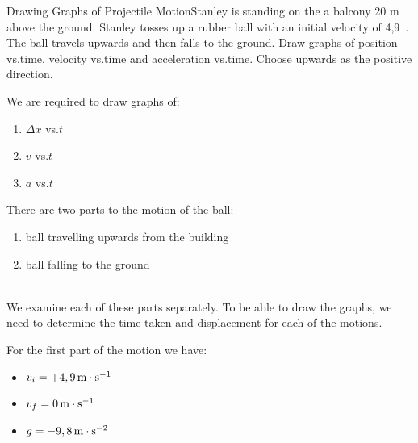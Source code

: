 \begin{wex}{Drawing Graphs of Projectile Motion}{Stanley is standing on the a balcony 20 m above the ground. Stanley tosses up a rubber ball with an initial velocity of 4,9~\ms. The ball travels upwards and then falls to the ground. Draw graphs of position vs.\@ time, velocity vs.\@ time and acceleration vs.\@ time. Choose upwards as the positive direction.}{
We are required to draw graphs of:\\
\begin{minipage}{\textwidth} 
	\begin{enumerate}
	\item $\Delta x$ vs.\@ $t$
	\item $v$ vs.\@ $t$
	\item $a$ vs.\@ $t$
	\end{enumerate}
\end{minipage}
There are two parts to the motion of the ball:\\
\begin{minipage}{\textwidth}
\begin{enumerate}
\item ball travelling upwards from the building
\item ball falling to the ground
\end{enumerate}
\end{minipage}\\
We examine each of these parts separately. To be able to draw the graphs, we need to determine the time taken and displacement for each of the motions.


\begin{minipage}{0.49\textwidth}
For the first part of the motion we have:
\begin{itemize}
\item{$v_i=+4,9\,\mathrm{m \cdot s^{-1}}$}
\item{$v_f=0\,\mathrm{m \cdot s^{-1}}$}
\item{$g=-9,8\,\mathrm{m \cdot s^{-2}}$}
\end{itemize}
\end{minipage}

}
\end{wex}
